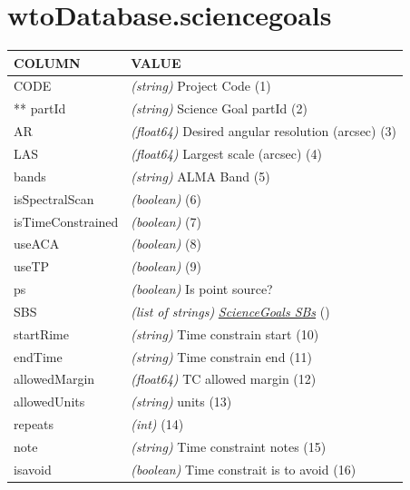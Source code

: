 \documentclass[a4paper,10pt,english]{sphinxmanual}
\begin{document}
\section{wtoDatabase.sciencegoals}
\label{wtodata:wtodatabase-sciencegoals}
\begin{tabulary}{\linewidth}{|L|L|}
\hline
\textsf{\relax 
COLUMN
} & \textsf{\relax 
VALUE
}\\
\hline
CODE
 & 
\emph{(string)} Project Code (1)
\\

** partId
 & 
\emph{(string)} Science Goal partId (2)
\\

AR
 & 
\emph{(float64)} Desired angular resolution (arcsec) (3)
\\

LAS
 & 
\emph{(float64)} Largest scale (arcsec) (4)
\\

bands
 & 
\emph{(string)} ALMA Band (5)
\\

isSpectralScan
 & 
\emph{(boolean)} (6)
\\

isTimeConstrained
 & 
\emph{(boolean)} (7)
\\

useACA
 & 
\emph{(boolean)} (8)
\\

useTP
 & 
\emph{(boolean)} (9)
\\

ps
 & 
\emph{(boolean)} Is point source?
\\

SBS
 & 
\emph{(list of strings)} {\hyperref[wtodata:sgsb]{\emph{ScienceGoals SBs}}} ()
\\

startRime
 & 
\emph{(string)} Time constrain start (10)
\\

endTime
 & 
\emph{(string)} Time constrain end (11)
\\

allowedMargin
 & 
\emph{(float64)} TC allowed margin (12)
\\

allowedUnits
 & 
\emph{(string)} units (13)
\\

repeats
 & 
\emph{(int)} (14)
\\

note
 & 
\emph{(string)} Time constraint notes (15)
\\

isavoid
 & 
\emph{(boolean)} Time constrait is to avoid (16)
\\
\hline\end{tabulary}
\end{document}
